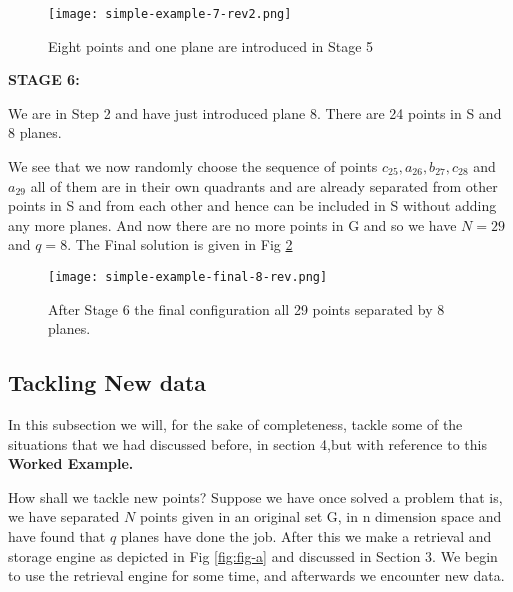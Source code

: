 \documentclass[english]{article}
\begin{document}
\medskip{}

\begin{figure}[htp]
 \begin{center}
\texttt{[image: simple-example-7-rev2.png]}

\caption{Eight points and one plane are introduced in Stage 5}

\label{fig:fig-g} \end{center}
\end{figure} 


\medskip{}


\textbf{STAGE 6:}

We are in Step 2 and have just introduced plane 8. There are 24 points
in S and 8 planes.

We see that we now randomly choose the sequence of points $c_{25},a_{26},b_{27},c_{28}$
and $a_{29}$ all of them are in their own quadrants and are already
separated from other points in S and from each other and hence can be
included in S without adding any more planes. And now there are no
more points in G and so we have $N=29$and $q=8$. The Final solution
is given in Fig \ref{fig:fig-h}

\medskip{}
\begin{figure}[htp]
 \begin{center}
\texttt{[image: simple-example-final-8-rev.png]}

\caption{After Stage 6 the final configuration all 29 points separated by 8 planes.}

\label{fig:fig-h} \end{center}
\end{figure} 

\newpage
\subsection{Tackling New data}

In this subsection we will, for the sake of completeness, tackle some of the situations that we had
discussed before, in section 4,but with reference
 to this \textbf{Worked  Example.}


How shall we tackle new points?  Suppose we have once solved a problem that is, we have separated $N$ points given in an original set G, in n dimension space and have found that $q$ planes have done the job. After this we make a retrieval and storage engine as depicted in Fig \ref{fig:fig-a}  and discussed in Section 3. We begin to use the retrieval engine for some time, and afterwards we encounter new data. 
\end{document}
